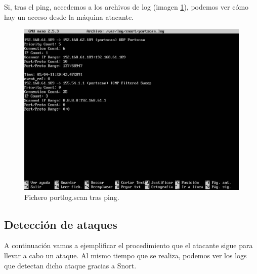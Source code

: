 \documentclass[a4,12pt,onecolum]{article}
\begin{document}
Si, tras el ping, accedemos a los archivos de log (imagen \ref{fig:snort4}), podemos ver cómo hay un acceso desde la máquina atacante.

\begin{figure}[htbp]
\centering
\includegraphics[width=1.0\textwidth]{./images/SnortPortLog.png}
\caption{Fichero portlog.scan tras ping.}
\label{fig:snort4}
\end{figure}

\subsection{Detección de ataques}

A continuación vamos a ejemplificar el procedimiento que el atacante sigue para llevar a cabo un ataque. Al mismo tiempo que se realiza, podemos ver los logs que detectan dicho ataque gracias a Snort.
\end{document}
